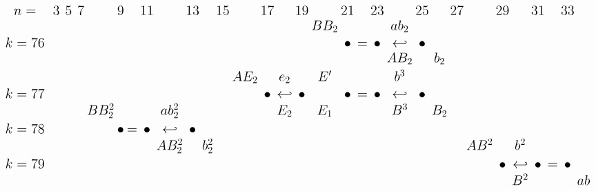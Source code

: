 \documentclass{article}
\begin{document}
\(
\begin{tikzcd}[
nodes={font=\Large,inner sep=0pt},
row sep=0.2cm,
column sep=0.1cm
]
n=& && 3 & & 5 & & 7 & & 9 & & 11 & & 13 & & 15 & & 17 & & 19 & & 21 & & 23 && 25 && 27 && 29 && 31 && 33\\
&& && && && && && && && && && BB_2 && && ab_2 \\
k=76& && && && && && && && && && && \bullet &=& \bullet &\hookleftarrow& \bullet && \\
&& && && && && && && && && && && && AB_2 && b_2 \\
&& && && && && && && && AE_2 && e_2 && E' && && b^3 \\
k=77& && && && && && && && && \bullet &\hookleftarrow& \bullet && \bullet &=& \bullet &\hookleftarrow& \bullet && \\
&& && && && BB_2^2 && && ab_2^2 && && && E_2 && E_1 && && B^3 && B_2 \\
k=78& && && && && \bullet &=& \bullet &\hookleftarrow& \bullet && \\
&& && && && && && AB_2^2 && b_2^2 && && && && && && && AB^2 && b^2 \\
k=79& && && && && && && && && && && && && && && \bullet &\hookleftarrow& \bullet &=& \bullet && \\
&& && && && && && && && && && && && && && && B^2 && && ab \\
\end{tikzcd}
\)
\end{document}
